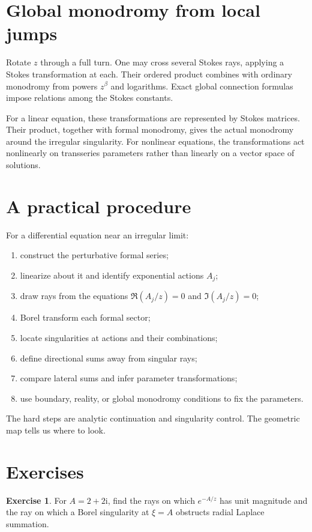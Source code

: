 \documentclass[11pt,openany]{book}
\theoremstyle{definition}
\newtheorem{exercise}{Exercise}[chapter]
\theoremstyle{plain}
\theoremstyle{remark}
\newcommand{\ii}{\mathrm{i}}
\begin{document}
\section{Global monodromy from local jumps}

Rotate $z$ through a full turn. One may cross several Stokes rays, applying a Stokes transformation at each. Their ordered product combines with ordinary monodromy from powers $z^\beta$ and logarithms. Exact global connection formulas impose relations among the Stokes constants.

For a linear equation, these transformations are represented by Stokes matrices. Their product, together with formal monodromy, gives the actual monodromy around the irregular singularity. For nonlinear equations, the transformations act nonlinearly on transseries parameters rather than linearly on a vector space of solutions.

\section{A practical procedure}

For a differential equation near an irregular limit:
\begin{enumerate}
 \item construct the perturbative formal series;
 \item linearize about it and identify exponential actions $A_j$;
 \item draw rays from the equations $\Re(A_j/z)=0$ and $\Im(A_j/z)=0$;
 \item Borel transform each formal sector;
 \item locate singularities at actions and their combinations;
 \item define directional sums away from singular rays;
 \item compare lateral sums and infer parameter transformations;
 \item use boundary, reality, or global monodromy conditions to fix the parameters.
\end{enumerate}
The hard steps are analytic continuation and singularity control. The geometric map tells us where to look.

\section{Exercises}

\begin{exercise}
For $A=2+2\ii$, find the rays on which $e^{-A/z}$ has unit magnitude and the ray on which a Borel singularity at $\xi=A$ obstructs radial Laplace summation.
\end{exercise}
\end{document}
